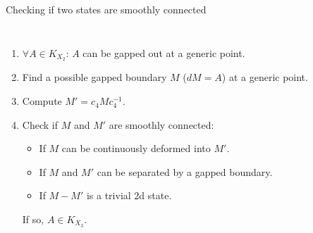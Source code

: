 \documentclass[xcolor=table, 11pt, aspectratio=169]{beamer}
\begin{document}
    \begin{frame}{Checking if two states are smoothly connected}
      \begin{columns}
        \begin{enumerate}
          \item<1-> $\forall A \in K_{X_2}$: $A$ can be gapped out at a generic point.
          \item<2-> Find a possible gapped boundary $M$ ($dM=A$) at a generic point.
          \item<3-> Compute $M'=c_4Mc_4^{-1}$.
          \item<4-> Check if $M$ and $M'$ are smoothly connected:
          \begin{itemize}
            \item If $M$ can be continuously deformed into $M'$.
            \item If $M$ and $M'$ can be separated by a gapped boundary.
            \item If $M-M'$ is a trivial 2d state.
          \end{itemize}
          If so, $A\in K_{X_3}$.
        \end{enumerate}
      \end{columns}
    \end{frame}
\end{document}
